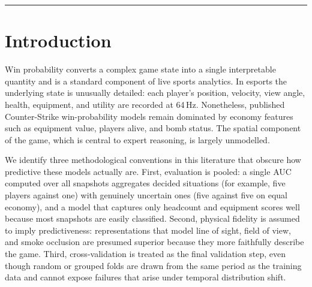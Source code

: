 \documentclass[11pt,a4paper]{article}
\begin{document}
\begin{abstract}
We then evaluate the model once on a temporally held-out set of 27 unseen 2026 matches.
The features derived from the match itself transfer with negligible degradation
($0.8493 \to 0.8501$), whereas the best cross-validated configuration degrades most
($0.8519 \to 0.8236$; expected calibration error $0.016 \to 0.071$) because its
player-skill pillar depends on an external, per-era statistics database that is
incomplete for the deployment period. This failure mode is invisible to
cross-validation by construction. Reconstructing the prior under three data
regimes, including a leak-free lagged prior and a leaky same-era prior at full
coverage, restores calibration but does not enable the skill pillar to exceed the
skill-free model out-of-time under any regime. Nor does re-encoding it: across four
encodings that successively remove a player-count confound, adjust for opponent calibre
and condition on situation, cross-validation prefers every one of them and the
out-of-time test prefers none. The result is a controlled negative finding: a correctly
constructed, coverage-complete and correctly encoded external skill prior does not
improve out-of-time performance in this setting.
\end{abstract}

\tableofcontents
\bigskip
\hrule
\bigskip

\section{Introduction}
\label{sec:intro}

Win probability converts a complex game state into a single interpretable quantity and
is a standard component of live sports analytics. In esports the underlying state is
unusually detailed: each player's position, velocity, view angle, health, equipment,
and utility are recorded at 64\,Hz. Nonetheless, published Counter-Strike
win-probability models remain dominated by economy features such as equipment value,
players alive, and bomb status. The spatial component of the game, which is central to
expert reasoning, is largely unmodelled.

We identify three methodological conventions in this literature that obscure how
predictive these models actually are. First, evaluation is pooled: a single AUC computed
over all snapshots aggregates decided situations (for example, five players against one)
with genuinely uncertain ones (five against five on equal economy), and a model that
captures only headcount and equipment scores well because most snapshots are easily
classified. Second, physical fidelity is assumed to imply predictiveness: representations
that model line of sight, field of view, and smoke occlusion are presumed superior
because they more faithfully describe the game. Third, cross-validation is treated as the
final validation step, even though random or grouped folds are drawn from the same period
as the training data and cannot expose failures that arise under temporal distribution
shift.
\end{document}
